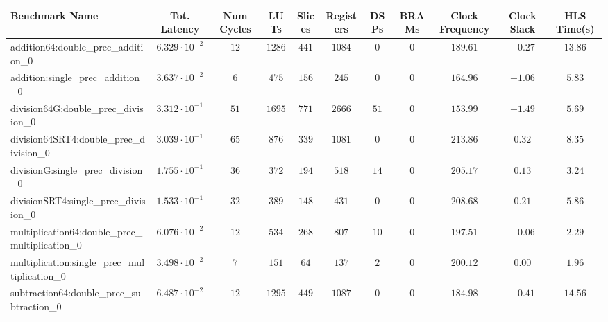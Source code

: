 \begin{tabular}{|l|c|c|c|c|c|c|c|c|c|c|}
\hline
Benchmark Name                                   & Tot. Latency            & Num Cycles & LUTs     & Slices   & Registers & DSPs   & BRAMs & Clock Frequency & Clock Slack & HLS Time(s) \\
\hline
addition64:double\_prec\_addition\_0             & $ 6.329 \cdot 10^{-2} $ & $ 12     $ & $ 1286 $ & $ 441  $ & $ 1084  $ & $ 0  $ & $ 0 $ & $ 189.61      $ & $ -0.27   $ & $ 13.86   $ \\
addition:single\_prec\_addition\_0               & $ 3.637 \cdot 10^{-2} $ & $ 6      $ & $ 475  $ & $ 156  $ & $ 245   $ & $ 0  $ & $ 0 $ & $ 164.96      $ & $ -1.06   $ & $ 5.83    $ \\
division64G:double\_prec\_division\_0            & $ 3.312 \cdot 10^{-1} $ & $ 51     $ & $ 1695 $ & $ 771  $ & $ 2666  $ & $ 51 $ & $ 0 $ & $ 153.99      $ & $ -1.49   $ & $ 5.69    $ \\
division64SRT4:double\_prec\_division\_0         & $ 3.039 \cdot 10^{-1} $ & $ 65     $ & $ 876  $ & $ 339  $ & $ 1081  $ & $ 0  $ & $ 0 $ & $ 213.86      $ & $ 0.32    $ & $ 8.35    $ \\
divisionG:single\_prec\_division\_0              & $ 1.755 \cdot 10^{-1} $ & $ 36     $ & $ 372  $ & $ 194  $ & $ 518   $ & $ 14 $ & $ 0 $ & $ 205.17      $ & $ 0.13    $ & $ 3.24    $ \\
divisionSRT4:single\_prec\_division\_0           & $ 1.533 \cdot 10^{-1} $ & $ 32     $ & $ 389  $ & $ 148  $ & $ 431   $ & $ 0  $ & $ 0 $ & $ 208.68      $ & $ 0.21    $ & $ 5.86    $ \\
multiplication64:double\_prec\_multiplication\_0 & $ 6.076 \cdot 10^{-2} $ & $ 12     $ & $ 534  $ & $ 268  $ & $ 807   $ & $ 10 $ & $ 0 $ & $ 197.51      $ & $ -0.06   $ & $ 2.29    $ \\
multiplication:single\_prec\_multiplication\_0   & $ 3.498 \cdot 10^{-2} $ & $ 7      $ & $ 151  $ & $ 64   $ & $ 137   $ & $ 2  $ & $ 0 $ & $ 200.12      $ & $ 0.00    $ & $ 1.96    $ \\
subtraction64:double\_prec\_subtraction\_0       & $ 6.487 \cdot 10^{-2} $ & $ 12     $ & $ 1295 $ & $ 449  $ & $ 1087  $ & $ 0  $ & $ 0 $ & $ 184.98      $ & $ -0.41   $ & $ 14.56   $ \\

\end{tabular}
